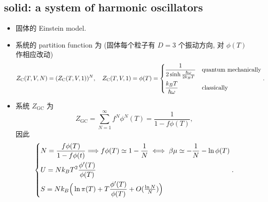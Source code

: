 \subsection{solid: a system of harmonic oscillators}
\begin{itemize}
	\item 固体的 Einstein model.
	
	\item 系统的 partition function 为 (固体每个粒子有 $D = 3$ 个振动方向, 对 $\phi(T)$ 作相应改动)
	\begin{equation}
		Z_\text{C}(T, V, N) = (Z_\text{C}(T, V, 1))^N, \quad Z_\text{C}(T, V, 1) = \phi(T) = \begin{dcases}
			\frac{1}{2 \sinh \frac{\hbar \omega}{2 k_B T}} & \text{quantum mechanically} \\
			\frac{k_B T}{\hbar \omega} & \text{classically}
		\end{dcases}.
	\end{equation}
	
	\item 系统 $Z_\text{GC}$ 为
	\begin{equation}
		Z_\text{GC} = \sum_{N = 1}^\infty f^N \phi^N(T) = \frac{1}{1 - f \phi(T)},
	\end{equation}
	因此
	\begin{equation} \label{4.5.7}
		\begin{dcases}
			N = \frac{f \phi(T)}{1 - f \phi(t)} \Longrightarrow f \phi(T) \simeq 1 - \frac{1}{N} \iff \beta \mu \simeq - \frac{1}{N} - \ln \phi(T) \\
			U = N k_B T^2 \frac{\phi'(T)}{\phi(T)} \\
			S = N k_B \Big( \ln \pi(T) + T \frac{\phi'(T)}{\phi(T)} + O({\textstyle \frac{\ln N}{N}}) \Big)
		\end{dcases}.
	\end{equation}
\end{itemize}

